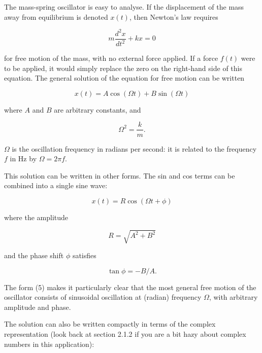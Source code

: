   The mass-spring oscillator is easy to analyse. If the displacement of the 
  mass away from equilibrium is denoted $x(t)$, then Newton's law requires 

  \begin{equation*}m \dfrac{d^2x}{dt^2} + kx=0 \tag{1}\end{equation*} 

  \noindent{}for free motion of the mass, with no external force applied. If a 
  force $f(t)$ were to be applied, it would simply replace the zero on the 
  right-hand side of this equation. The general solution of the equation for 
  free motion can be written 

  \begin{equation*}x(t)=A \cos(\Omega t) + B \sin(\Omega t) 
  \tag{2}\end{equation*} 

  \noindent{}where $A$ and $B$ are arbitrary constants, and 

  \begin{equation*}\Omega^2=\dfrac{k}{m}. \tag{3}\end{equation*} 

  $\Omega$ is the oscillation frequency in radians per second: it is related to 
  the frequency $f$ in Hz by $\Omega = 2 \pi f \tag{4}$. 

  This solution can be written in other forms. The sin and cos terms can be 
  combined into a single sine wave: 

  \begin{equation*}x(t) = R \cos(\Omega t + \phi) \tag{5}\end{equation*} 

  \noindent{}where the amplitude 

  \begin{equation*}R = \sqrt{A^2 + B^2} \tag{6}\end{equation*} 

  \noindent{}and the phase shift $\phi$ satisfies 

  \begin{equation*}\tan{\phi} = -B/A. \tag{7}\end{equation*} 

  The form (5) makes it particularly clear that the most general free motion of 
  the oscillator consists of sinusoidal oscillation at (radian) frequency 
  $\Omega$, with arbitrary amplitude and phase. 

  The solution can also be written compactly in terms of the complex 
  representation (look back at section 2.1.2 if you are a bit hazy about 
  complex numbers in this application): 

